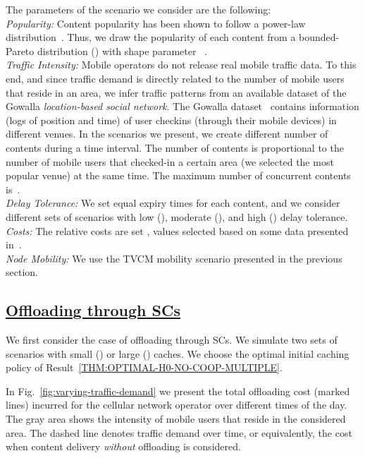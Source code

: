 \documentclass[10pt,conference,letterpaper]{IEEEtran}
\begin{document}
\noindent The parameters of the scenario we consider are the following:\\
\textit{ Popularity:} Content popularity has been shown to follow a power-law distribution~\cite{youtube-traffic-from-edge,top-video-cellular,pptv-mobile-vod}. Thus, we draw the popularity of each content from a bounded-Pareto distribution () with shape parameter ~\cite{youtube-traffic-from-edge}.\\
\textit{ Traffic Intensity:} Mobile operators do not release real mobile traffic data. To this end, and since traffic demand is directly related to the number of mobile users that reside in an area, we infer traffic patterns from an available dataset of the Gowalla \textit{location-based social network}. The Gowalla dataset~\cite{Theus-comcom2012} contains information (logs of position and time) of user checkins (through their mobile devices) in different venues. In the scenarios we present, we create different number of contents during a  time interval. The number of contents  is proportional to the number of mobile users that checked-in a certain area (we selected the most popular venue) at the same time. The maximum number of concurrent contents is~.\\
\textit{ Delay Tolerance:} We set equal expiry times  for each content, and we consider different sets of scenarios with low (), moderate (), and high () delay tolerance.\\
\textit{ Costs:} The relative costs are set , values selected based on some data presented in~\cite{johansson2007cost}.\\
\textit{ Node Mobility:} We use the TVCM mobility scenario presented in the previous section.

\subsection*{\underline{Offloading through SCs}} 
We first consider the case of offloading through SCs. We simulate two sets of scenarios with small () or large () caches. We choose the optimal initial caching policy of Result~\ref{THM:OPTIMAL-H0-NO-COOP-MULTIPLE}.

In Fig.~\ref{fig:varying-traffic-demand} we present the total offloading cost (marked lines) incurred for the cellular network operator over different times of the day. The gray area shows the intensity of mobile users that reside in the considered area. The dashed line denotes traffic demand over time, or equivalently, the cost when content delivery \textit{without} offloading is considered.
\end{document}
